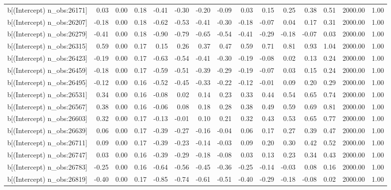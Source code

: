 \begin{table}[ht]
\begin{tabular}{rrrrrrrrrrrrrrr}
  b[(Intercept) n\_obs:26171] & 0.03 & 0.00 & 0.18 & -0.41 & -0.30 & -0.20 & -0.09 & 0.03 & 0.15 & 0.25 & 0.38 & 0.51 & 2000.00 & 1.00 \\ 
  b[(Intercept) n\_obs:26207] & -0.18 & 0.00 & 0.18 & -0.62 & -0.53 & -0.41 & -0.30 & -0.18 & -0.07 & 0.04 & 0.17 & 0.31 & 2000.00 & 1.00 \\ 
  b[(Intercept) n\_obs:26279] & -0.41 & 0.00 & 0.18 & -0.90 & -0.79 & -0.65 & -0.54 & -0.41 & -0.29 & -0.18 & -0.07 & 0.03 & 2000.00 & 1.00 \\ 
  b[(Intercept) n\_obs:26315] & 0.59 & 0.00 & 0.17 & 0.15 & 0.26 & 0.37 & 0.47 & 0.59 & 0.71 & 0.81 & 0.93 & 1.04 & 2000.00 & 1.00 \\ 
  b[(Intercept) n\_obs:26423] & -0.19 & 0.00 & 0.17 & -0.63 & -0.54 & -0.41 & -0.30 & -0.19 & -0.08 & 0.02 & 0.13 & 0.24 & 2000.00 & 1.00 \\ 
  b[(Intercept) n\_obs:26459] & -0.18 & 0.00 & 0.17 & -0.59 & -0.51 & -0.39 & -0.29 & -0.19 & -0.07 & 0.03 & 0.15 & 0.24 & 2000.00 & 1.00 \\ 
  b[(Intercept) n\_obs:26495] & -0.12 & 0.00 & 0.16 & -0.52 & -0.45 & -0.33 & -0.22 & -0.12 & -0.01 & 0.09 & 0.20 & 0.29 & 2000.00 & 1.00 \\ 
  b[(Intercept) n\_obs:26531] & 0.34 & 0.00 & 0.16 & -0.08 & 0.02 & 0.14 & 0.23 & 0.33 & 0.44 & 0.54 & 0.65 & 0.74 & 2000.00 & 1.00 \\ 
  b[(Intercept) n\_obs:26567] & 0.38 & 0.00 & 0.16 & -0.06 & 0.08 & 0.18 & 0.28 & 0.38 & 0.49 & 0.59 & 0.69 & 0.81 & 2000.00 & 1.00 \\ 
  b[(Intercept) n\_obs:26603] & 0.32 & 0.00 & 0.17 & -0.13 & -0.01 & 0.10 & 0.21 & 0.32 & 0.43 & 0.53 & 0.65 & 0.77 & 2000.00 & 1.00 \\ 
  b[(Intercept) n\_obs:26639] & 0.06 & 0.00 & 0.17 & -0.39 & -0.27 & -0.16 & -0.04 & 0.06 & 0.17 & 0.27 & 0.39 & 0.47 & 2000.00 & 1.00 \\ 
  b[(Intercept) n\_obs:26711] & 0.09 & 0.00 & 0.17 & -0.39 & -0.23 & -0.14 & -0.03 & 0.09 & 0.20 & 0.30 & 0.42 & 0.52 & 2000.00 & 1.00 \\ 
  b[(Intercept) n\_obs:26747] & 0.03 & 0.00 & 0.16 & -0.39 & -0.29 & -0.18 & -0.08 & 0.03 & 0.13 & 0.23 & 0.34 & 0.43 & 2000.00 & 1.00 \\ 
  b[(Intercept) n\_obs:26783] & -0.25 & 0.00 & 0.16 & -0.64 & -0.56 & -0.45 & -0.36 & -0.25 & -0.14 & -0.03 & 0.08 & 0.16 & 2000.00 & 1.00 \\ 
  b[(Intercept) n\_obs:26819] & -0.40 & 0.00 & 0.17 & -0.85 & -0.74 & -0.61 & -0.51 & -0.40 & -0.29 & -0.18 & -0.08 & 0.02 & 2000.00 & 1.00 \\ 

\end{tabular}
\end{table}
